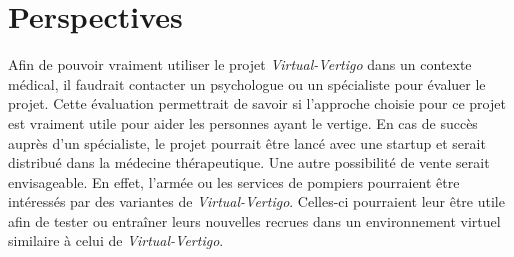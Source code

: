 \section{Perspectives}
Afin de pouvoir vraiment utiliser le projet \textit{Virtual-Vertigo} dans un contexte médical, il faudrait contacter un psychologue ou un spécialiste pour évaluer le projet. Cette évaluation permettrait de savoir si l'approche choisie pour ce projet est vraiment utile pour aider les personnes ayant le vertige. En cas de succès auprès d'un spécialiste, le projet pourrait être lancé avec une \textsf{startup} et serait distribué dans la médecine thérapeutique. Une autre possibilité de vente serait envisageable. En effet, l'armée ou les services de pompiers pourraient être intéressés par des variantes de \textit{Virtual-Vertigo}. Celles-ci pourraient leur être utile afin de tester ou entraîner leurs nouvelles recrues dans un environnement virtuel similaire à celui de \textit{Virtual-Vertigo}. 

